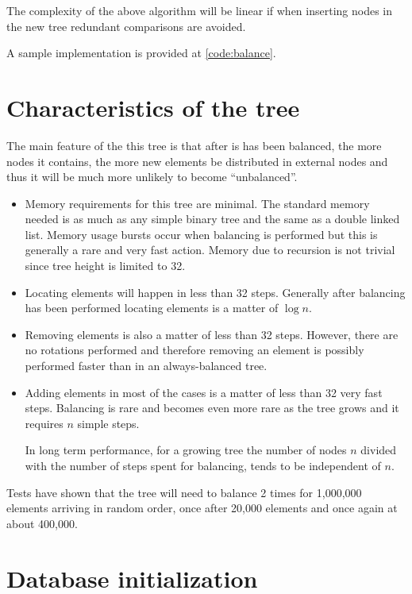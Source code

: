 \documentclass[twocolumn]{article}
\begin{document}
The complexity of the above algorithm will be linear if when inserting nodes
in the new tree redundant comparisons are avoided.

A sample implementation is provided at \ref{code:balance}.

\section{Characteristics of the tree}

The main feature of the this tree is that after is has been balanced, the
more nodes it contains, the more new elements be distributed in external
nodes and thus it will be much more unlikely to become ``unbalanced''.

\begin{itemize}
\item
   Memory requirements for this tree are minimal. The standard memory needed
   is as much as any simple binary tree and the same as a double linked
   list. Memory usage bursts occur when
   balancing is performed but this is generally a rare and very fast action.
   Memory due to recursion is not trivial since tree height is limited
   to 32.
\item
   Locating elements will happen in less than 32 steps. Generally after
   balancing has been performed locating elements is a matter of $\log{n}$.
\item
   Removing elements is also a matter of less than 32 steps.
   However, there are no rotations performed and therefore removing an
   element is possibly performed faster than in an always-balanced tree.
\item
   Adding elements in most of the cases is a matter of less than 32 very
   fast steps.
   Balancing is rare and becomes even more rare as the tree grows and it
   requires $n$ simple steps.

   In long term performance, for a growing tree the number of nodes $n$
   divided with the number of steps spent for balancing, tends to be
   independent of $n$.
\end{itemize}

Tests have shown that the tree will need to balance 2 times for
1,000,000 elements arriving in random order, once after 20,000 elements
and once again at about 400,000.

\section{Database initialization}
\label{init}
\end{document}
